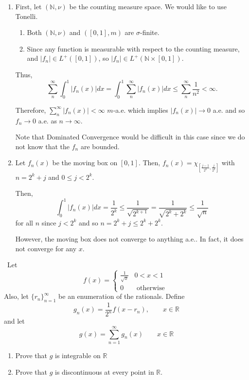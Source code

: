 \documentclass[12pt]{Homework}
\begin{document}
\begin{solution}$\,$
\begin{enumerate}[label=(\alph*)]
    \item First, let $(\mathbb{N},\nu)$ be the counting measure space. We would like to use Tonelli.
    \begin{enumerate}
        \item Both $(\mathbb{N},\nu)$ and $([0,1],m)$ are $\sigma$-finite.
        \item Since any function is measurable with respect to the counting measure, and $|f_n|\in L^+([0,1])$, so $|f_n|\in L^+(\mathbb{N}\times[0,1])$. 
    \end{enumerate}
    Thus,
    $$\sum_n^\infty\int_0^1|f_n(x)|dx=\int_0^1\sum_n^\infty|f_n(x)|dx\le\sum_n^\infty\frac{1}{n^2}<\infty.$$
    
    Therefore, $\sum_n^\infty|f_n(x)|<\infty$ $m$-a.e. which implies $|f_n(x)|\to 0$ a.e. and so $f_n\to0$ a.e. as $n\to\infty$.
    
    Note that Dominated Convergence would be difficult in this case since we do not know that the $f_n$ are bounded. 
    
    \item Let $f_n(x)$ be the moving box on $[0,1]$. Then, $f_n(x)=\chi_{[\frac{j-1}{2^k},\frac{j}{2^k}]}$ with $n=2^k+j$ and $0\le j< 2^k$.
    
    Then, $$\int_0^1|f_n(x)|dx=\frac{1}{2^k}\le\frac{1}{\sqrt{2^{k+1}}}=\frac{1}{\sqrt{2^k+2^k}}\le\frac{1}{\sqrt{n}}$$ for all $n$ since $j<2^k$ and so $n=2^k+j\le 2^k+2^k$.
    
    However, the moving box does not converge to anything a.e.. In fact, it does not converge for any $x$.
\end{enumerate}
\end{solution}
\newpage

\begin{problem}[Folland, 2.3.25, p.59] $\,$
Let \[
f(x)=\begin{cases}
\frac{1}{\sqrt{x}} & 0<x<1\\
0 & \text{ otherwise }
\end{cases}
\]
Also, let $\{r_n\}_{n=1}^\infty$ be an enumeration of the rationals. Define $$g_n(x)=\frac{1}{2^n}f(x-r_n),\qquad x\in\mathbb{R}$$ and let $$g(x)=\sum_{n=1}^\infty g_n(x)\qquad x\in\mathbb{R}$$
\begin{enumerate}[label=(\alph*)]
    \item Prove that $g$ is integrable on $\mathbb{R}$
    \item Prove that $g$ is discontinuous at every point in $\mathbb{R}$.
\end{enumerate}
\end{problem}
\end{document}
